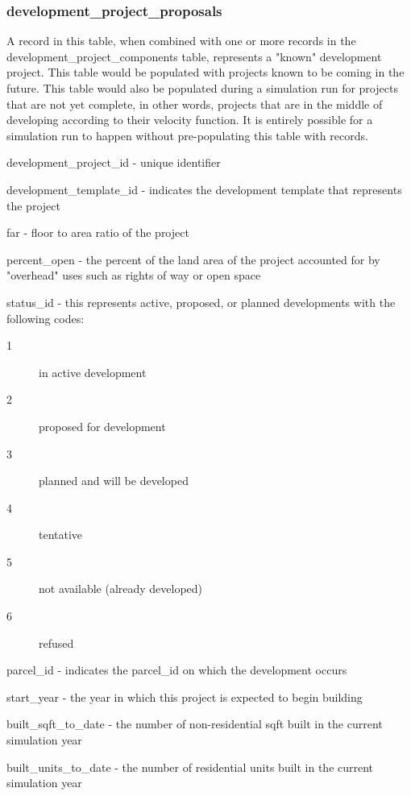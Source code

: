 \subsubsection{development\_project\_proposals} 

A record in this table, when combined with one or more records in the development\_project\_components table, represents a "known" development project. This table would be populated with projects known to be coming in the future. This table would also be populated during a simulation run for projects that are not yet complete, in other words, projects that are in the middle of developing according to their velocity function. It is entirely possible for a simulation run to happen without pre-populating this table with records.

\begin{description}
\item development\_project\_id - unique identifier
\item development\_template\_id - indicates the development template that represents the project
\item far - floor to area ratio of the project
\item percent\_open - the percent of the land area of the project accounted for by "overhead" uses such as rights of way or open space
\item status\_id - this represents active, proposed, or planned developments with the following codes: 
  \begin{description}
  \item[1] in active development
  \item[2] proposed for development
  \item[3] planned and will be developed
  \item[4] tentative
  \item[5] not available (already developed)
  \item[6]  refused
  \end{description}
\item parcel\_id - indicates the parcel\_id on which the development occurs
\item start\_year - the year in which this project is expected to begin building
\item built\_sqft\_to\_date - the number of non-residential sqft built in the current simulation year
\item built\_units\_to\_date - the number of residential units built in the current simulation year 
\end{description}

